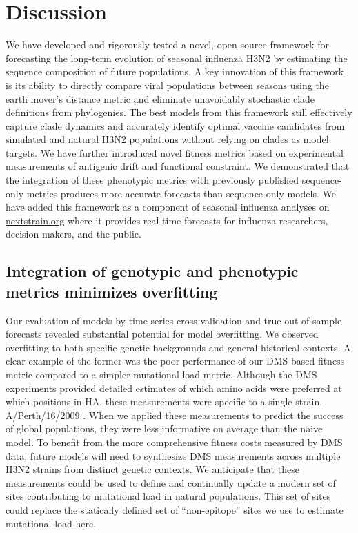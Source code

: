 \section*{Discussion}

We have developed and rigorously tested a novel, open source framework for forecasting the long-term evolution of seasonal influenza H3N2 by estimating the sequence composition of future populations.
A key innovation of this framework is its ability to directly compare viral populations between seasons using the earth mover's distance metric \cite{Rubner1998} and eliminate unavoidably stochastic clade definitions from phylogenies.
The best models from this framework still effectively capture clade dynamics and accurately identify optimal vaccine candidates from simulated and natural H3N2 populations without relying on clades as model targets.
We have further introduced novel fitness metrics based on experimental measurements of antigenic drift and functional constraint.
We demonstrated that the integration of these phenotypic metrics with previously published sequence-only metrics produces more accurate forecasts than sequence-only models.
We have added this framework as a component of seasonal influenza analyses on \href{https://nextstrain.org/flu}{nextstrain.org} where it provides real-time forecasts for influenza researchers, decision makers, and the public.

\subsection*{Integration of genotypic and phenotypic metrics minimizes overfitting}

Our evaluation of models by time-series cross-validation and true out-of-sample forecasts revealed substantial potential for model overfitting.
We observed overfitting to both specific genetic backgrounds and general historical contexts.
A clear example of the former was the poor performance of our DMS-based fitness metric compared to a simpler mutational load metric.
Although the DMS experiments provided detailed estimates of which amino acids were preferred at which positions in HA, these measurements were specific to a single strain, A/Perth/16/2009 \cite{Lee2018}.
When we applied these measurements to predict the success of global populations, they were less informative on average than the naive model.
To benefit from the more comprehensive fitness costs measured by DMS data, future models will need to synthesize DMS measurements across multiple H3N2 strains from distinct genetic contexts.
We anticipate that these measurements could be used to define and continually update a modern set of sites contributing to mutational load in natural populations.
This set of sites could replace the statically defined set of ``non-epitope'' sites we use to estimate mutational load here.

